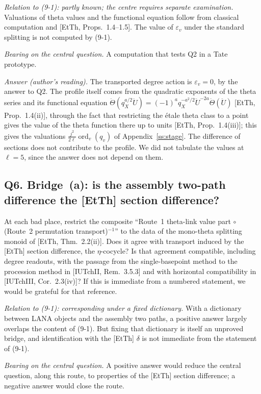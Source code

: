 \documentclass[11pt]{article}
\newcommand{\ord}{\operatorname{ord}}
\theoremstyle{definition}
\begin{document}
\emph{Relation to (9-1): partly known; the centre requires
separate examination.}  Valuations of theta values and the
functional equation follow from classical computation and [EtTh,
Props.~1.4--1.5].  The value of $\varepsilon_v$ under the standard
splitting is not computed by (9-1).

\emph{Bearing on the central question.}  A computation that tests Q2
in a Tate prototype.

\emph{Answer (author's reading).}  The transported degree action is
$\varepsilon_v=0$, by the answer to Q2.  The profile itself comes from
the quadratic exponents of the theta series and its functional
equation
$\ddot\Theta(q_X^{a/2}\ddot U)=(-1)^aq_X^{-a^2/2}\ddot U^{-2a}\ddot\Theta(\ddot U)$
[EtTh, Prop.~1.4(ii)], through the fact that restricting the \'etale
theta class to a point gives the value of the theta function there up
to units [EtTh, Prop.~1.4(iii)]; this gives the valuations
$\frac{j^2}{2\ell}\ord_v(q_v)$ of Appendix~\ref{ss:stage}.  The
difference of sections does not contribute to the profile.  We did
not tabulate the values at $\ell=5$, since the answer does not depend
on them.

\subsection*{Q6. Bridge~(a): is the assembly two-path difference the [EtTh] section difference?}

At each bad place, restrict the composite
``Route~1 theta-link value part $\circ$ (Route~2 permutation
transport)${}^{-1}$'' to the data of the mono-theta splitting
monoid of [EtTh, Thm.~2.2(ii)].  Does it agree with transport
induced by the [EtTh] section difference, the $\eta$-cocycle?
Is that agreement compatible, including degree readouts, with
the passage from the single-basepoint method to the procession
method in [IUTchII, Rem.~3.5.3] and with horizontal compatibility
in [IUTchIII, Cor.~2.3(iv)]?  If this is immediate from a numbered
statement, we would be grateful for that reference.

\emph{Relation to (9-1): corresponding under a fixed dictionary.}
With a dictionary between LANA objects and the assembly two
paths, a positive answer largely overlaps the content of (9-1).
But fixing that dictionary is itself an unproved bridge, and
identification with the [EtTh] $\delta$ is not immediate from the
statement of (9-1).

\emph{Bearing on the central question.}  A positive answer would
reduce the central question, along this route, to properties of the
[EtTh] section difference; a negative answer would close the route.
\end{document}
